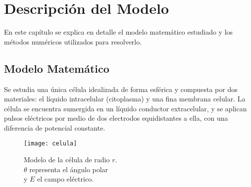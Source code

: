 \chapter{Descripción del Modelo} \label{chap:modelo}




En este capítulo se explica en detalle el modelo matemático estudiado y los métodos numéricos utilizados para resolverlo.

\section{Modelo Matemático}

Se estudia una única célula idealizada de forma esférica y compuesta por dos materiales: el líquido intracelular (citoplasma) y una fina membrana celular. La célula se encuentra sumergida en un líquido conductor extracelular, y se aplican pulsos eléctricos por medio de dos electrodos equidistantes a ella, con una diferencia de potencial constante.



\begin{figure}[h]
  \begin{minipage}[r]{0.50\textwidth}
    \texttt{[image: celula]}
  \end{minipage}\hfill
  \begin{minipage}[l]{0.5\textwidth}
    \caption{
       Modelo de la célula de radio $r$.\\ $\theta$ representa el ángulo polar\\ y $E$ el campo eléctrico.
    } \label{fig:03-03}
  \end{minipage}
\end{figure}

